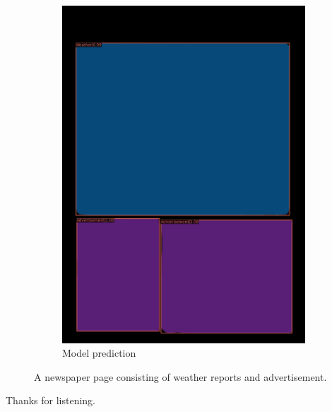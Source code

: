 \documentclass[aspectratio=1610]{beamer}
\begin{document}
\begin{frame}
\begin{figure}
\begin{subfigure}{.25\textwidth}
  \includegraphics[width=0.99\linewidth, clip=true, trim = 0mm 0mm 0mm 0mm]{figures/labels-vanilla-0.75/Jd55Bvg.jpg}
  \caption{Model prediction}
\end{subfigure}
\caption{A newspaper page consisting of weather reports and advertisement.}
\label{fig:weather}
\end{figure}
\end{frame}
\normalpage

\begin{frame}
  Thanks for listening.

\end{frame}
\normalpage
\end{document}
